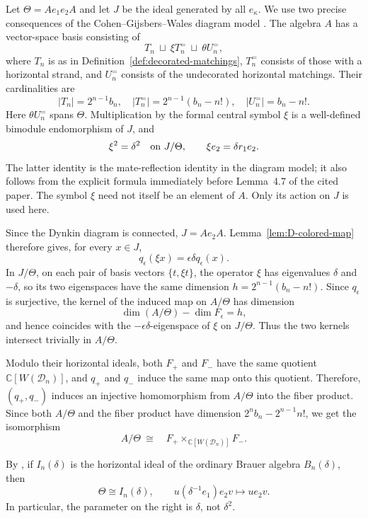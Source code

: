 \documentclass[11pt,a4paper]{amsart}
\theoremstyle{uprightdefinition}
\theoremstyle{remark}\newtheorem{remark}[theorem]{Remark}
\begin{document}
Let $\Theta=Ae_1e_2A$ and let $J$ be the ideal generated by all $e_{\kappa}$.
We use two precise consequences of the Cohen--Gijsbers--Wales diagram model
\cite[Definitions~4.2, 4.4 and Proposition~4.8]{CGWDiagrams2007}.
The algebra $A$ has a vector-space basis consisting of
\[
 T_n\ \sqcup\ \xi T_n^{=}\ \sqcup\ \theta U_n^{=},
\]
where $T_n$ is as in Definition~\ref{def:decorated-matchings},
$T_n^{=}$ consists of those with a horizontal strand, and $U_n^{=}$
consists of the undecorated horizontal matchings. Their cardinalities are
\[
 |T_n|=2^{n-1}b_n,\quad |T_n^{=}|=2^{n-1}(b_n-n!),
 \quad |U_n^{=}|=b_n-n!.
\]
Here $\theta U_n^{=}$ spans $\Theta$. Multiplication by the formal central
symbol $\xi$ is a well-defined bimodule endomorphism of $J$, and
\[
 \xi^2=\delta^2\quad\hbox{on }J/\Theta,
 \qquad \xi e_2=\delta r_1e_2.
\]
The latter identity is the mate-reflection identity in the diagram model;
it also follows from the explicit formula immediately before Lemma~4.7
of the cited paper. The symbol $\xi$ need not itself be an element of $A$.
Only its action on $J$ is used here.

Since the Dynkin diagram is connected, $J=Ae_2A$. Lemma~\ref{lem:D-colored-map}
therefore gives, for every $x\in J$,
\[
 q_\epsilon(\xi x)=\epsilon\delta q_\epsilon(x).
\]
In $J/\Theta$, on each pair of basis vectors $\{t,\xi t\}$, the operator $\xi$ has eigenvalues $\delta$ and $-\delta$, so its two eigenspaces have the same dimension
$h=2^{n-1}(b_n-n!)$. Since $q_\epsilon$ is surjective,
the kernel of the induced map on $A/\Theta$ has dimension
\[
 \dim(A/\Theta)-\dim F_\epsilon=h,
\]
and hence coincides with the $-\epsilon\delta$-eigenspace of $\xi$ on $J/\Theta$.
Thus the two kernels intersect trivially in $A/\Theta$.

Modulo their horizontal ideals, both $F_+$ and $F_-$ have the same quotient $\mathbb C[W(\mathscr{D}_n)]$, and $q_+$ and $q_-$ induce the same map onto this quotient. Therefore, $(q_+,q_-)$ induces an injective homomorphism from $A/\Theta$ into the fiber product. Since both $A/\Theta$ and the fiber product have dimension
$2^n b_n-2^{n-1}n!$, we get the isomorphism
\begin{equation}\label{eq:D-fiber-product}
 A/\Theta\ \cong\quad
 F_+\mathop{\times}_{\mathbb C[W(\mathscr{D}_n)]}F_-.
\end{equation}

By \cite[Proposition 6.4(ii)]{CGW2007}, if $I_n(\delta)$ is the horizontal
ideal of the ordinary Brauer algebra $B_n(\delta)$, then
\begin{equation}\label{eq:D-theta-ordinary}
 \Theta\cong I_n(\delta),\qquad
 u(\delta^{-1}e_1)e_2v\longmapsto u e_2v.
\end{equation}
In particular, the parameter on the right is $\delta$, not $\delta^2$.
\end{document}
